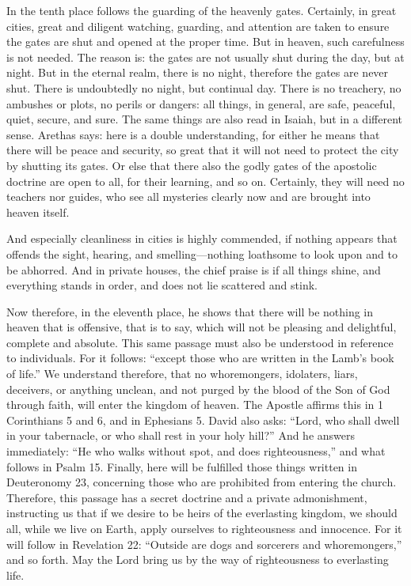 In the tenth place follows the guarding of the heavenly gates. Certainly, in great cities, great and diligent watching, guarding, and attention are taken to ensure the gates are shut and opened at the proper time. But in heaven, such carefulness is not needed. The reason is: the gates are not usually shut during the day, but at night. But in the eternal realm, there is no night, therefore the gates are never shut. There is undoubtedly no night, but continual day. There is no treachery, no ambushes or plots, no perils or dangers: all things, in general, are safe, peaceful, quiet, secure, and sure. The same things are also read in Isaiah, but in a different sense. Arethas says: here is a double understanding, for either he means that there will be peace and security, so great that it will not need to protect the city by shutting its gates. Or else that there also the godly gates of the apostolic doctrine are open to all, for their learning, and so on. Certainly, they will need no teachers nor guides, who see all mysteries clearly now and are brought into heaven itself.

And especially cleanliness in cities is highly commended, if nothing appears that offends the sight, hearing, and smelling—nothing loathsome to look upon and to be abhorred. And in private houses, the chief praise is if all things shine, and everything stands in order, and does not lie scattered and stink.

Now therefore, in the eleventh place, he shows that there will be nothing in heaven that is offensive, that is to say, which will not be pleasing and delightful, complete and absolute. This same passage must also be understood in reference to individuals. For it follows: “except those who are written in the Lamb’s book of life.” We understand therefore, that no whoremongers, idolaters, liars, deceivers, or anything unclean, and not purged by the blood of the Son of God through faith, will enter the kingdom of heaven. The Apostle affirms this in 1 Corinthians 5 and 6, and in Ephesians 5. David also asks: “Lord, who shall dwell in your tabernacle, or who shall rest in your holy hill?” And he answers immediately: “He who walks without spot, and does righteousness,” and what follows in Psalm 15. Finally, here will be fulfilled those things written in Deuteronomy 23, concerning those who are prohibited from entering the church. Therefore, this passage has a secret doctrine and a private admonishment, instructing us that if we desire to be heirs of the everlasting kingdom, we should all, while we live on Earth, apply ourselves to righteousness and innocence. For it will follow in Revelation 22: “Outside are dogs and sorcerers and whoremongers,” and so forth. May the Lord bring us by the way of righteousness to everlasting life.
